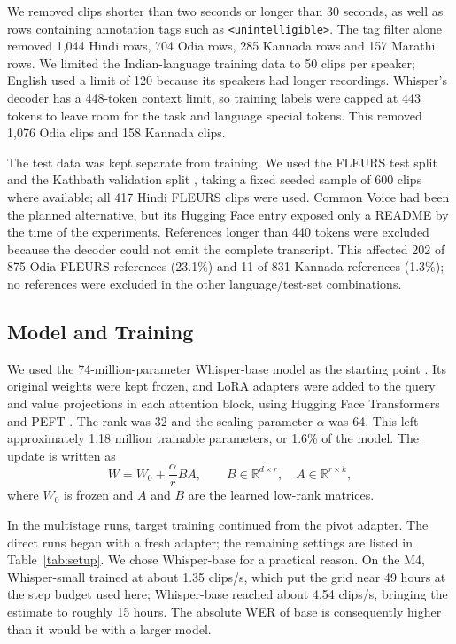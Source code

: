 \documentclass[conference]{IEEEtran}
\begin{document}
We removed clips shorter than two seconds or longer than 30 seconds,
as well as rows containing annotation tags such as
\texttt{<unintelligible>}. The tag filter alone removed
1,044 Hindi rows, 704 Odia rows, 285 Kannada rows and 157 Marathi rows.
We limited the Indian-language training data to 50 clips per speaker;
English used a limit of 120 because its speakers had longer recordings.
Whisper's decoder has a 448-token context limit, so training labels
were capped at 443 tokens to leave room for the task and language
special tokens. This removed 1,076 Odia clips and 158 Kannada clips.

The test data was kept separate from training. We used the FLEURS test
split \cite{conneau2023fleurs} and the Kathbath validation split
\cite{javed2023indicsuperb}, taking a fixed seeded sample of 600 clips
where available; all 417 Hindi FLEURS clips were used. Common Voice
\cite{ardila2020commonvoice} had been the planned alternative, but its
Hugging Face entry exposed only a README by the time of the experiments.
References longer than 440 tokens were excluded because the decoder
could not emit the complete transcript. This affected 202 of 875 Odia
FLEURS references (23.1\%) and 11 of 831 Kannada references (1.3\%); no
references were excluded in the other language/test-set combinations.

\subsection{Model and Training}

We used the 74-million-parameter Whisper-base model as the starting
point \cite{radford2023whisper}. Its original weights were kept frozen,
and LoRA adapters \cite{hu2022lora} were added to the query and value
projections in each attention block, using Hugging Face Transformers
\cite{wolf2020transformers} and PEFT \cite{peft2022}. The rank was 32
and the scaling parameter $\alpha$ was 64. This left approximately 1.18
million trainable parameters, or 1.6\% of the model. The update is
written as
\begin{equation}
W = W_0 + \frac{\alpha}{r}BA, \qquad
B \in \mathbb{R}^{d\times r},\quad A \in \mathbb{R}^{r\times k},
\label{eq:lora}
\end{equation}
where $W_0$ is frozen and $A$ and $B$ are the learned low-rank matrices.

In the multistage runs, target training continued from the pivot adapter.
The direct runs began with a fresh adapter; the remaining settings are
listed in Table~\ref{tab:setup}. We chose Whisper-base for a practical
reason. On the M4, Whisper-small trained at about 1.35 clips/s, which
put the grid near 49 hours at the step budget used here; Whisper-base
reached about 4.54 clips/s, bringing the estimate to roughly 15 hours.
The absolute WER of base is consequently higher than it would be with a
larger model.
\end{document}
